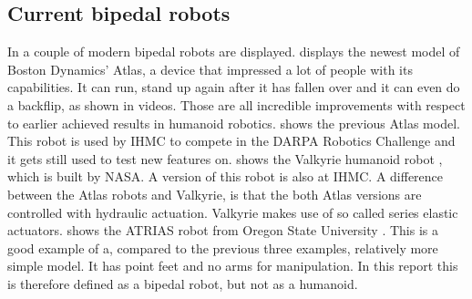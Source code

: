 \subsection{Current bipedal robots}
In  a couple of modern bipedal robots are displayed.  displays the newest model of Boston Dynamics' Atlas, a device that impressed a lot of people with its capabilities. It can run, stand up again after it has fallen over and it can even do a backflip, as shown in videos. Those are all incredible improvements with respect to earlier achieved results in humanoid robotics.  shows the previous Atlas model. This robot is used by IHMC to compete in the DARPA Robotics Challenge \cite{johnson2015team} and it gets still used to test new features on.  shows the Valkyrie humanoid robot \cite{radford2015valkyrie}, which is built by NASA. A version of this robot is also at IHMC. A difference between the Atlas robots and Valkyrie, is that the both Atlas versions are controlled with hydraulic actuation. Valkyrie makes use of so called series elastic actuators.  shows the ATRIAS robot from Oregon State University \cite{ramezani2014performance}. This is a good example of a, compared to the previous three examples, relatively more simple model. It has point feet and no arms for manipulation. In this report this is therefore defined as a bipedal robot, but not as a humanoid.
